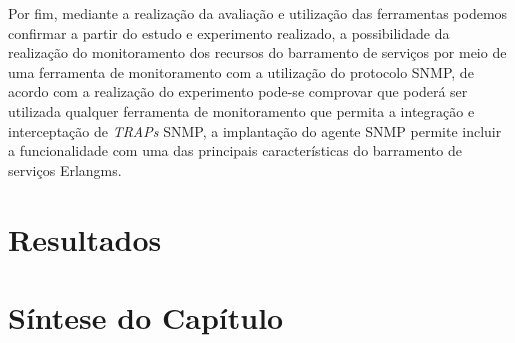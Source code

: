 Por fim, mediante a realização da avaliação e utilização das ferramentas podemos confirmar a partir do estudo e experimento realizado, a possibilidade da realização do monitoramento dos recursos do barramento de serviços por meio de uma ferramenta de monitoramento com a utilização do protocolo \acrshort{SNMP}, de acordo com a realização do experimento pode-se comprovar que poderá ser utilizada qualquer ferramenta de monitoramento que permita a integração e interceptação de \textit{TRAPs} \acrshort{SNMP}, a implantação do agente \acrshort{SNMP} permite incluir a funcionalidade com uma das principais características do barramento de serviços Erlangms.   



\section{Resultados}
\label{resultados}


\section{Síntese do Capítulo}
\label{sintese5}